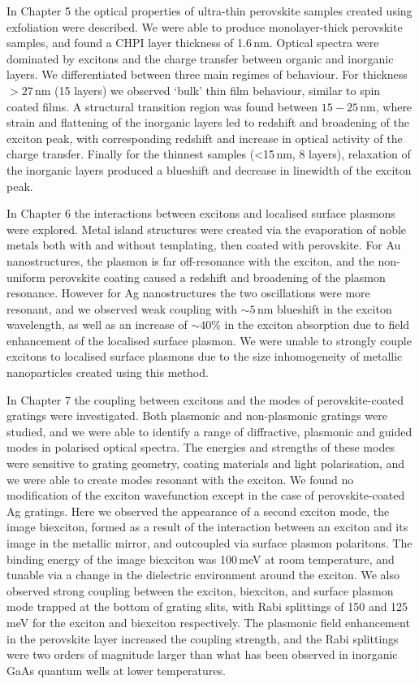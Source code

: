 In Chapter 5 the optical properties of ultra-thin perovskite samples created using exfoliation were described. We were able to produce monolayer-thick perovskite samples, and found a CHPI layer thickness of 1.6\,nm. Optical spectra were dominated by excitons and the charge transfer between organic and inorganic layers. We differentiated between three main regimes of behaviour. For thickness $>27$\,nm (15 layers) we observed `bulk' thin film behaviour, similar to spin coated films. A structural transition region was found between $15-25$\,nm, where strain and flattening of the inorganic layers led to redshift and broadening of the exciton peak, with corresponding redshift and increase in optical activity of the charge transfer. Finally for the thinnest samples (<15\,nm, 8 layers), relaxation of the inorganic layers produced a blueshift and decrease in linewidth of the exciton peak.

In Chapter 6 the interactions between excitons and localised surface plasmons were explored. Metal island structures were created via the evaporation of noble metals both with and without templating, then coated with perovskite. For Au nanostructures, the plasmon is far off-resonance with the exciton, and the non-uniform perovskite coating caused a redshift and broadening of the plasmon resonance. However for Ag nanostructures the two oscillations were more resonant, and we observed weak coupling with $\sim 5$\,nm blueshift in the exciton wavelength, as well as an increase of $\sim 40$\% in the exciton absorption due to field enhancement of the localised surface plasmon. We were unable to strongly couple excitons to localised surface plasmons due to the size inhomogeneity of metallic nanoparticles created using this method.

In Chapter 7 the coupling between excitons and the modes of perovskite-coated gratings were investigated. Both plasmonic and non-plasmonic gratings were studied, and we were able to identify a range of diffractive, plasmonic and guided modes in polarised optical spectra. The energies and strengths of these modes were sensitive to grating geometry, coating materials and light polarisation, and we were able to create modes resonant with the exciton. We found no modification of the exciton wavefunction except in the case of perovskite-coated Ag gratings. Here we observed the appearance of a second exciton mode, the image biexciton, formed as a result of the interaction between an exciton and its image in the metallic mirror, and outcoupled via surface plasmon polaritons. The binding energy of the image biexciton was 100\,meV at room temperature, and tunable via a change in the dielectric environment around the exciton. We also observed strong coupling between the exciton, biexciton, and surface plasmon mode trapped at the bottom of grating slits, with Rabi splittings of 150 and 125\,meV for the exciton and biexciton respectively. The plasmonic field enhancement in the perovskite layer increased the coupling strength, and the Rabi splittings were two orders of magnitude larger than what has been observed in inorganic GaAs quantum wells at lower temperatures.

